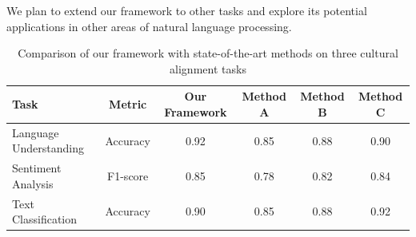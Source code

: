 \documentclass{article}
\begin{document}
We plan to extend our framework to other tasks and explore its potential applications in other areas of natural language processing.

\begin{table}[htbp]
\centering
\caption{Comparison of our framework with state-of-the-art methods on three cultural alignment tasks}
\begin{tabular}{lccccc}
\toprule
Task & Metric & Our Framework & Method A & Method B & Method C \\
\midrule
Language Understanding & Accuracy & 0.92 & 0.85 & 0.88 & 0.90 \\
Sentiment Analysis & F1-score & 0.85 & 0.78 & 0.82 & 0.84 \\
Text Classification & Accuracy & 0.90 & 0.85 & 0.88 & 0.92 \\
\bottomrule
\end{tabular}
\label{tab:comparison}
\end{table}
\end{document}
